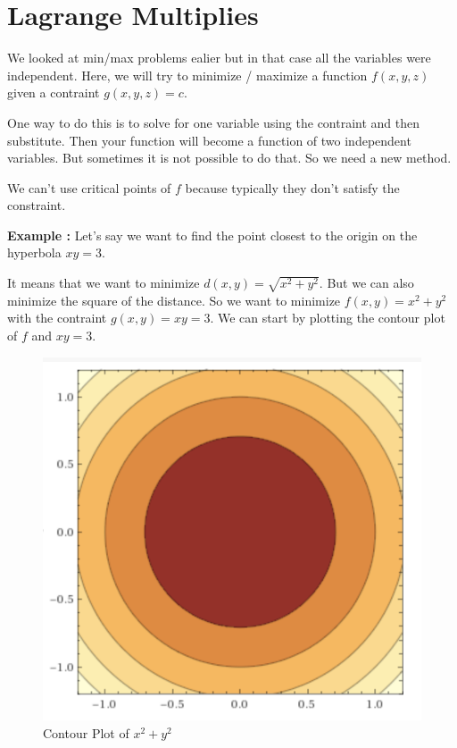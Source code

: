 

\chapter{Lagrange Multiplies}

\bigbreak

We looked at min/max problems ealier but in that case all the variables were independent.
Here, we will try to minimize / maximize a function $f(x, y, z)$ given a contraint $g(x, y, z) = c$.

One way to do this is to solve for one variable using the contraint and then substitute. 
Then your function will become a function of two independent variables. But sometimes it is not possible to do that.
So we need a new method.

We can't use critical points of $f$ because typically they don't satisfy the constraint.


{\bf Example : } Let's say we want to find the point closest to the origin on the hyperbola $xy = 3$.

It means that we want to minimize $d(x, y) = \sqrt{x^2 + y^2}$. 
But we can also minimize the square of the distance.
So we want to minimize $f(x, y) = x^2 + y^2$ with the contraint $g(x, y) = xy = 3$.
We can start by plotting the contour plot of $f$ and $xy = 3$.

\begin{figure}[ht!]
    \centering
    \includegraphics[scale=0.7]{./images/lecture_8_figure_1.png}
    \caption{Contour Plot of $x^2 + y^2$}
\end{figure}

